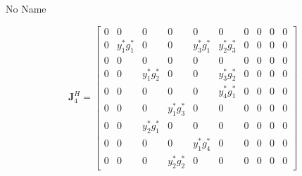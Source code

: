 \documentclass[a4paper,10pt]{article}
\begin{document}
\begin{section}{No Name}
\begin{landscape}
\begin{equation}
\end{equation}
\begin{equation}
\boldsymbol{J}_4^H = 
\begin{bmatrix}
0&0&0&0&0&0&0&0&0&0\\
0&y_1^*g_1^*&0&0&y_3^*g_1^*&y_2^*g_3^*&0&0&0&0\\
0&0&0&0&0&0&0&0&0&0\\
0&0&y_1^*g_2^*&0&0&y_3^*g_2^*&0&0&0&0\\
0&0&0&0&0&y_4^*g_1^*&0&0&0&0\\
0&0&0&y_1^*g_3^*&0&0&0&0&0&0\\
0&0&y_2^*g_1^*&0&0&0&0&0&0&0\\
0&0&0&0&y_1^*g_4^*&0&0&0&0&0\\
0&0&0&y_2^*g_2^*&0&0&0&0&0&0
\end{bmatrix}
\end{equation}
\end{landscape}

\end{section}
\end{document}
